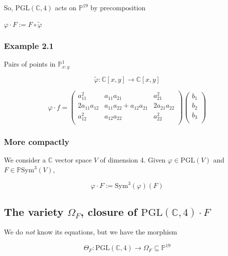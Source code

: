\documentclass[11pt]{article}
\begin{document}
So, \(\mathrm{PGL}(\mathbb{C},4)\) acts on \(\mathbb{P}^{19}\) by precomposition

\(\varphi\cdot F := F\circ \tilde{\varphi}\)
\subsubsection{Example 2.1}
\label{sec:orgeb9f6ee}

Pairs of points in \(\mathbb{P}^1_{x:y}\)

$$\tilde{\varphi} : \mathbb{C}[x,y]\to \mathbb{C}[x,y]$$

$$ \varphi\cdot f = \left( \begin{array}{ccccc}
                             a_{11}^2 & a_{11}a_{21} & a_{21}^2 \\
                             2a_{11}a_{12} & a_{11}a_{22}+a_{12}a_{21} & 2a_{21}a_{22} \\
                             a_{12}^2 & a_{12}a_{22} & a_{22}^2 \\
                           \end{array}\right) \left(
                           \begin{array}{c}
                             b_1\\
                             b_2\\
                             b_3\\
\end{array}\right)$$

\subsubsection{More compactly}
\label{sec:org960437c}

We consider a \(\mathbb{C}\) vector space \(V\) of dimension 4.
Given
\(\varphi\in \mathrm{PGL}(V)\) and \(F\in \mathbb{P} \mathrm{Sym}^3(V)\),

$$\varphi\cdot  F := \mathrm{Sym}^3(\varphi)(F)$$

\subsection{The variety \(\Omega_{F}\), closure of \(\mathrm{PGL}(\mathbb{C},4)\cdot F\)}
\label{sec:org8c4aa2e}

We do \emph{not} know its equations, but we have the morphism

$$ \Theta_F: \mathrm{PGL}(\mathbb{C},4) \to \Omega_F \subseteq \mathbb{P}^{19}$$
\end{document}
